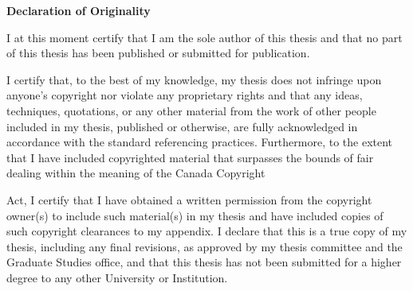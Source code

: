 \newpage
{}
\begin{center}
	\textbf{Declaration of Originality}
\end{center}

\par I at this moment certify that I am the sole author of this thesis and that no part of this thesis has been published or submitted for publication.\newline
\par I certify that, to the best of my knowledge, my thesis does not infringe upon anyone's copyright nor violate any proprietary rights and that any ideas, techniques, quotations, or any other material from the work of other people included in my thesis, published or otherwise, are fully acknowledged in accordance with the standard referencing practices. Furthermore, to the extent that I have included copyrighted material that surpasses the bounds of fair dealing within the meaning of the Canada Copyright \par Act, I certify that I have obtained a written permission from the copyright owner(s) to include such material(s) in my thesis and have included copies of such copyright clearances to my appendix.\newline
I declare that this is a true copy of my thesis, including any final revisions, as approved by my thesis committee and the Graduate Studies office, and that this thesis has not been submitted for a higher degree to any other University or Institution.